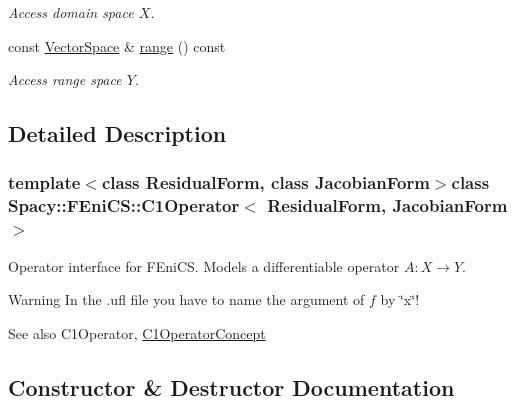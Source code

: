 \begin{DoxyCompactItemize}
\begin{DoxyCompactList}\small\item\em Access domain space $X$. \end{DoxyCompactList}\item 
\hypertarget{classSpacy_1_1OperatorBase_ab19d3b7a6f290b1079248f1e567e53d6}{}const \hyperlink{classSpacy_1_1VectorSpace}{Vector\+Space} \& \hyperlink{classSpacy_1_1OperatorBase_ab19d3b7a6f290b1079248f1e567e53d6}{range} () const \label{classSpacy_1_1OperatorBase_ab19d3b7a6f290b1079248f1e567e53d6}

\begin{DoxyCompactList}\small\item\em Access range space $Y$. \end{DoxyCompactList}\end{DoxyCompactItemize}


\subsection{Detailed Description}
\subsubsection*{template$<$class Residual\+Form, class Jacobian\+Form$>$class Spacy\+::\+F\+Eni\+C\+S\+::\+C1\+Operator$<$ Residual\+Form, Jacobian\+Form $>$}

Operator interface for F\+Eni\+C\+S. Models a differentiable operator $A:X\rightarrow Y$. 

\begin{DoxyWarning}{Warning}
In the .ufl file you have to name the argument of $f$ by \char`\"{}x\char`\"{}! 
\end{DoxyWarning}
\begin{DoxySeeAlso}{See also}
C1\+Operator, \hyperlink{group__ConceptGroup_C1OperatorConceptAnchor}{C1\+Operator\+Concept} 
\end{DoxySeeAlso}


\subsection{Constructor \& Destructor Documentation}
\hypertarget{classSpacy_1_1FEniCS_1_1C1Operator_af23d84bd48d0902011bf80ba2f4cd394}{}
